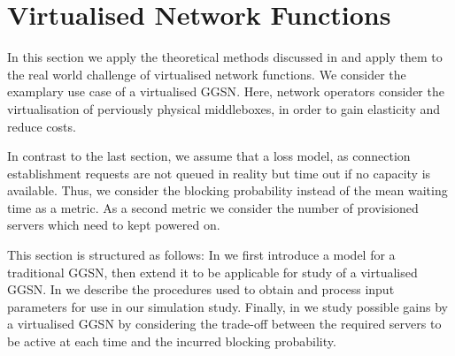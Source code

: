 \section{Virtualised Network Functions}\label{sec:cloud:virtualized_network_functions}
\newcommand{\blockingprobability}[0]{p_B}
\newcommand{\maxServers}[0]{S_{\max}}
In this section we apply the theoretical methods discussed in  and apply them to the real world challenge of virtualised network functions.
We consider the examplary use case of a virtualised \gls{GGSN}.
Here, network operators consider the virtualisation of perviously physical middleboxes, in order to gain elasticity and reduce costs.

In contrast to the last section, we assume that a loss model, as connection establishment requests are not queued in reality but time out if no capacity is available.
Thus, we consider the blocking probability instead of the mean waiting time as a metric.
As a second metric we consider the number of provisioned servers which need to kept powered on. 

This section is structured as follows:
In  we first introduce a model for a traditional \gls{GGSN}, then extend it to be applicable for study of a virtualised \gls{GGSN}.
In  we describe the procedures used to obtain and process input parameters for use in our simulation study.
Finally, in  we study possible gains by a virtualised \gls{GGSN} by considering the trade-off between the required servers to be active at each time and the incurred blocking probability. 



